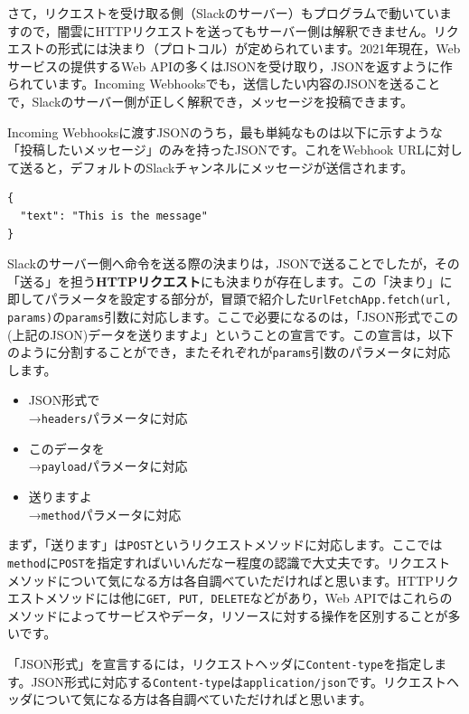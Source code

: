 \documentclass[uplatex,a4j]{jsarticle}
\begin{document}
さて，リクエストを受け取る側（Slackのサーバー）もプログラムで動いていますので，闇雲にHTTPリクエストを送ってもサーバー側は解釈できません。リクエストの形式には決まり（プロトコル）が定められています。2021年現在，Webサービスの提供するWeb APIの多くはJSONを受け取り，JSONを返すように作られています。Incoming Webhooksでも，送信したい内容のJSONを送ることで，Slackのサーバー側が正しく解釈でき，メッセージを投稿できます。


Incoming Webhooksに渡すJSONのうち，最も単純なものは以下に示すような「投稿したいメッセージ」のみを持ったJSONです。これをWebhook URLに対して送ると，デフォルトのSlackチャンネルにメッセージが送信されます。
\begin{lstlisting}[basicstyle=\ttfamily\footnotesize,frame=single,caption=Minimum JSON payload for Incomming Webhooks,label=jsonpayload]
{
  "text": "This is the message"
}
\end{lstlisting}

Slackのサーバー側へ命令を送る際の決まりは，JSONで送ることでしたが，その「送る」を担う\textbf{HTTPリクエスト}にも決まりが存在します。この「決まり」に即してパラメータを設定する部分が，冒頭で紹介した\verb|UrlFetchApp.fetch(url, params)|の\verb|params|引数に対応します。ここで必要になるのは，「JSON形式でこの(上記のJSON)データを送りますよ」ということの宣言です。この宣言は，以下のように分割することができ，またそれぞれが\verb|params|引数のパラメータに対応します。

\begin{itemize}
\item JSON形式で\\
→\verb|headers|パラメータに対応
\item このデータを\\
→\verb|payload|パラメータに対応
\item 送りますよ\\
→\verb|method|パラメータに対応
\end{itemize}


まず，「送ります」は\verb|POST|というリクエストメソッドに対応します。ここでは\verb|method|に\verb|POST|を指定すればいいんだなー程度の認識で大丈夫です。リクエストメソッドについて気になる方は各自調べていただければと思います。HTTPリクエストメソッドには他に\verb|GET, PUT, DELETE|などがあり，Web APIではこれらのメソッドによってサービスやデータ，リソースに対する操作を区別することが多いです。


「JSON形式」を宣言するには，リクエストヘッダに\verb|Content-type|を指定します。JSON形式に対応する\verb|Content-type|は\verb|application/json|です。リクエストヘッダについて気になる方は各自調べていただければと思います。
\end{document}
